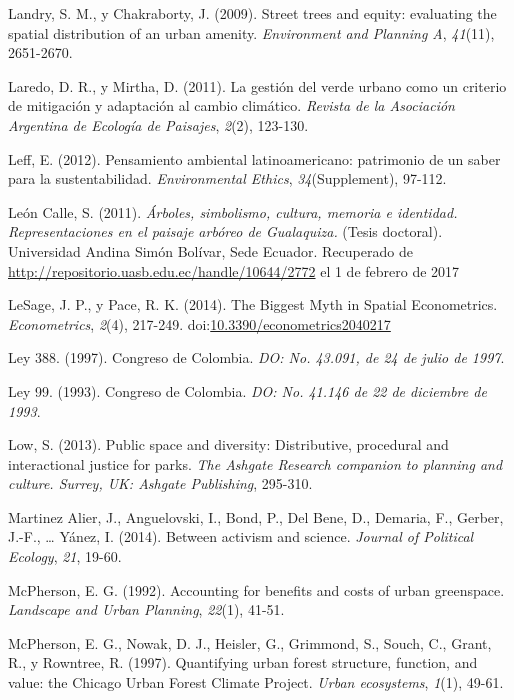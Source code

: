 \documentclass[12pt,a4paper,oneside, openany]{book}
\theoremstyle{definition}
\theoremstyle{definition}
\theoremstyle{definition}
\theoremstyle{remark}
\begin{document}
\hypertarget{ref-landry_street_2009}{}
Landry, S. M., y Chakraborty, J. (2009). Street trees and equity:
evaluating the spatial distribution of an urban amenity.
\emph{Environment and Planning A}, \emph{41}(11), 2651-2670.

\hypertarget{ref-laredo_gestion_2011}{}
Laredo, D. R., y Mirtha, D. (2011). La gestión del verde urbano como un
criterio de mitigación y adaptación al cambio climático. \emph{Revista
de la Asociación Argentina de Ecología de Paisajes}, \emph{2}(2),
123-130.

\hypertarget{ref-leff_pensamiento_2012}{}
Leff, E. (2012). Pensamiento ambiental latinoamericano: patrimonio de un
saber para la sustentabilidad. \emph{Environmental Ethics},
\emph{34}(Supplement), 97-112.

\hypertarget{ref-leon_calle_arboles_2011}{}
León Calle, S. (2011). \emph{Árboles, simbolismo, cultura, memoria e
identidad. Representaciones en el paisaje arbóreo de Gualaquiza.}
(Tesis doctoral). Universidad Andina Simón Bolívar, Sede Ecuador.
Recuperado de \url{http://repositorio.uasb.edu.ec/handle/10644/2772} el
1 de febrero de 2017

\hypertarget{ref-lesage_biggest_2014}{}
LeSage, J. P., y Pace, R. K. (2014). The Biggest Myth in Spatial
Econometrics. \emph{Econometrics}, \emph{2}(4), 217-249.
doi:\href{https://doi.org/10.3390/econometrics2040217}{10.3390/econometrics2040217}

\hypertarget{ref-ley388col}{}
Ley 388. (1997). Congreso de Colombia. \emph{DO: No. 43.091, de 24 de
julio de 1997}.

\hypertarget{ref-ley99col}{}
Ley 99. (1993). Congreso de Colombia. \emph{DO: No. 41.146 de 22 de
diciembre de 1993}.

\hypertarget{ref-low_public_2013}{}
Low, S. (2013). Public space and diversity: Distributive, procedural and
interactional justice for parks. \emph{The Ashgate Research companion to
planning and culture. Surrey, UK: Ashgate Publishing}, 295-310.

\hypertarget{ref-martinez_alier_between_2014}{}
Martinez Alier, J., Anguelovski, I., Bond, P., Del Bene, D., Demaria,
F., Gerber, J.-F., \ldots{} Yánez, I. (2014). Between activism and
science. \emph{Journal of Political Ecology}, \emph{21}, 19-60.

\hypertarget{ref-mcpherson1992accounting}{}
McPherson, E. G. (1992). Accounting for benefits and costs of urban
greenspace. \emph{Landscape and Urban Planning}, \emph{22}(1), 41-51.

\hypertarget{ref-mcpherson_quantifying_1997}{}
McPherson, E. G., Nowak, D. J., Heisler, G., Grimmond, S., Souch, C.,
Grant, R., y Rowntree, R. (1997). Quantifying urban forest structure,
function, and value: the Chicago Urban Forest Climate Project.
\emph{Urban ecosystems}, \emph{1}(1), 49-61.
\end{document}

